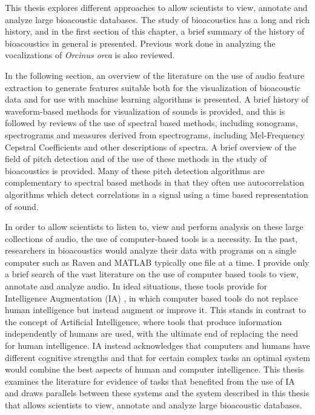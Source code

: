 
\label{chap:relatedWork}

This thesis explores different approaches to allow scientists to view,
annotate and analyze large bioacoustic databases.  The study of
bioacoustics has a long and rich history, and in the first section of
this chapter, a brief summary of the history of bioacoustics in
general is presented.  Previous work done in analyzing the
vocalizations of \textit{Orcinus orca} is also reviewed.

In the following section, an overview of the literature on the use of
audio feature extraction to generate features suitable both for the
visualization of bioacoustic data and for use with machine learning
algorithms is presented.  A brief history of waveform-based
methods for visualization of sounds is provided, and this is
followed by reviews of the use of spectral based methods, including
sonograms, spectrograms and measures derived from spectrograms,
including Mel-Frequency Cepstral Coefficients and other descriptions
of spectra.  A brief overview of the field of pitch detection and of
the use of these methods in the study of bioacoustics is
provided.  Many of these pitch detection algorithms are complementary
to spectral based methods in that they often use autocorrelation
algorithms which detect correlations in a signal using a time based
representation of sound.

In order to allow scientists to listen to, view and perform analysis
on these large collections of audio, the use of computer-based tools
is a necessity.  In the past, researchers in bioacoustics would
analyze their data with programs on a single computer such as Raven
and MATLAB typically one file at a time.  I provide only a brief
search of the vast literature on the use of computer based tools to
view, annotate and analyze audio.  In ideal situations, these tools
provide for Intelligence Augmentation (IA)
\cite{biocca1996intelligence}, in which computer based tools do not
replace human intelligence but instead augment or improve it.  This
stands in contrast to the concept of Artificial Intelligence, where
tools that produce information independently of humans are used, with
the ultimate end of replacing the need for human intelligence.  IA
instead acknowledges that computers and humans have different
cognitive strengths and that for certain complex tasks an optimal
system would combine the best aspects of human and computer
intelligence.  This thesis examines the literature for evidence of
tasks that benefited from the use of IA and draws parallels between
these systems and the system described in this thesis that allows
scientists to view, annotate and analyze large bioacoustic databases.

